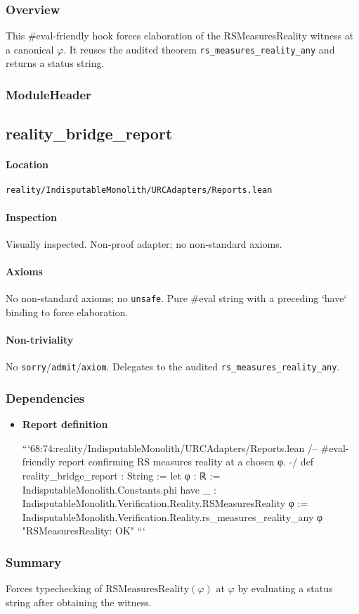\documentclass{article}
\newcommand{\FileRef}[1]{\texttt{#1}}
\newcommand{\ModuleHeader}[3]{%
  \subsection{#1}
  \paragraph{Location} \FileRef{#2}\\
  \paragraph{Inspection} #3
}
\begin{document}
\subsubsection{Overview}
This #eval‑friendly hook forces elaboration of the RSMeasuresReality witness at a canonical \(\varphi\). It reuses the audited theorem \texttt{rs\_measures\_reality\_any} and returns a status string.

\subsubsection{ModuleHeader}
\ModuleHeader{reality\_bridge\_report}{reality/IndisputableMonolith/URCAdapters/Reports.lean}{Visually inspected. Non‑proof adapter; no non‑standard axioms.}

\paragraph{Axioms}
No non‑standard axioms; no \texttt{unsafe}. Pure #eval string with a preceding `have` binding to force elaboration.

\paragraph{Non-triviality}
No \texttt{sorry}/\texttt{admit}/\texttt{axiom}. Delegates to the audited \texttt{rs\_measures\_reality\_any}.

\subsubsection{Dependencies}
\begin{itemize}[leftmargin=*]
  \item \textbf{Report definition}

```68:74:reality/IndisputableMonolith/URCAdapters/Reports.lean
/-- #eval-friendly report confirming RS measures reality at a chosen φ. -/
 def reality_bridge_report : String :=
  let φ : ℝ := IndisputableMonolith.Constants.phi
  have _ : IndisputableMonolith.Verification.Reality.RSMeasuresReality φ :=
    IndisputableMonolith.Verification.Reality.rs_measures_reality_any φ
  "RSMeasuresReality: OK"
```
\end{itemize}

\subsubsection{Summary}
Forces typechecking of \(\mathrm{RSMeasuresReality}(\varphi)\) at \(\varphi\) by evaluating a status string after obtaining the witness.
\end{document}
